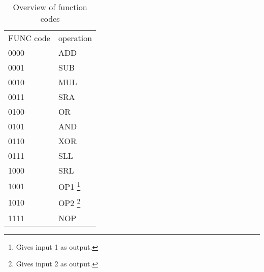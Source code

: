 \begin{savenotes}
\begin{table}
\centering
    \begin{tabular}{| l | l |}
     \hline
     FUNC code & operation \\
     0000      & ADD       \\
     0001      & SUB       \\
     0010      & MUL       \\
     0011      & SRA       \\
     0100      & OR        \\
     0101      & AND       \\
     0110      & XOR       \\
     0111      & SLL       \\
     1000      & SRL       \\
     1001      & OP1 \footnote{Gives input 1 as output.}       \\
     1010      & OP2 \footnote{Gives input 2 as output.}      \\
     1111      & NOP       \\
     \hline
   \end{tabular}
    \caption{Overview of function codes}
    \label{fpga:tbl:alu_function_codes_tbl}



\end{table}
\end{savenotes}